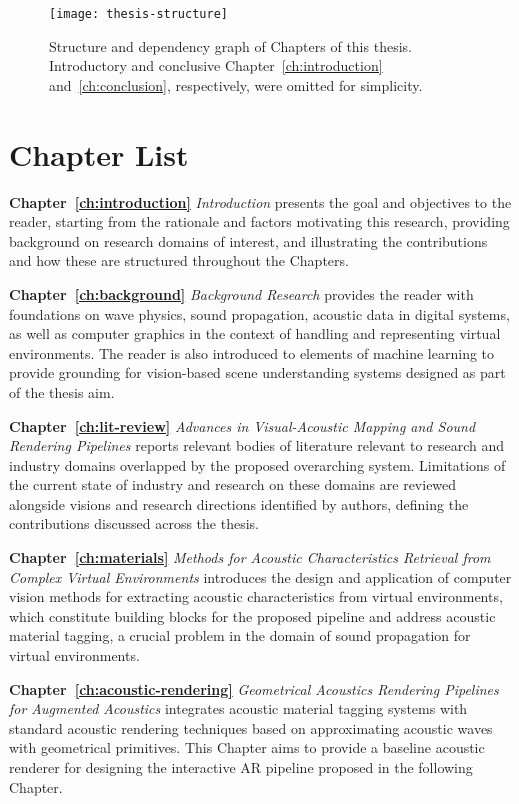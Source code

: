 \begin{figure}[htbp]
    \centering
    \texttt{[image: thesis-structure]}
    \caption[Thesis structure overview]{Structure and dependency graph of Chapters of this thesis. Introductory and conclusive Chapter~\ref{ch:introduction} and~\ref{ch:conclusion}, respectively, were omitted for simplicity.}
    \label{fig:thesis-structure}
\end{figure}

\section{Chapter List}
\textbf{Chapter~\ref{ch:introduction}} \textit{Introduction} presents the goal and objectives to the reader, starting from the rationale and factors motivating this research, providing background on research domains of interest, and illustrating the contributions and how these are structured throughout the Chapters.

\textbf{Chapter~\ref{ch:background}} \textit{Background Research} provides the reader with foundations on wave physics, sound propagation, acoustic data in digital systems, as well as computer graphics in the context of handling and representing virtual environments. The reader is also introduced to elements of machine learning to provide grounding for vision-based scene understanding systems designed as part of the thesis aim.

\textbf{Chapter~\ref{ch:lit-review}} \textit{Advances in Visual-Acoustic Mapping and Sound Rendering Pipelines} reports relevant bodies of literature relevant to research and industry domains overlapped by the proposed overarching system. Limitations of the current state of industry and research on these domains are reviewed alongside visions and research directions identified by authors, defining the contributions discussed across the thesis.

\textbf{Chapter~\ref{ch:materials}} \textit{Methods for Acoustic Characteristics Retrieval from Complex Virtual Environments} introduces the design and application of computer vision methods for extracting acoustic characteristics from virtual environments, which constitute building blocks for the proposed pipeline and address acoustic material tagging, a crucial problem in the domain of sound propagation for virtual environments.

\textbf{Chapter~\ref{ch:acoustic-rendering}} \textit{Geometrical Acoustics Rendering Pipelines for Augmented Acoustics} integrates acoustic material tagging systems with standard acoustic rendering techniques based on approximating acoustic waves with geometrical primitives. This Chapter aims to provide a baseline acoustic renderer for designing the interactive AR pipeline proposed in the following Chapter.

